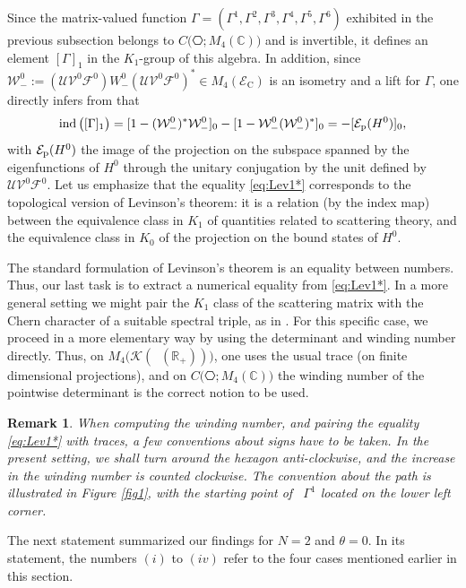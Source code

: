 \documentclass[11pt]{article}
\def\C{\mathbb C}
\def\EEC{\mathscr E_{\mathrm C}}
\def\E{\mathcal  E}
\def\F{\mathscr F}
\def\K{\mathscr K}
\def\R{\mathbb R}
\def\U{\mathcal U}
\def\V{\mathcal V}
\def\W{\mathcal W}
\def\ltwo{\mathop{\mathrm{L}^2}\nolimits}
\def\ind{\mathop{\mathrm{ind}}\nolimits}
\newtheorem{Remark}[Theorem]{Remark}
\begin{document}
Since the matrix-valued function $\Gamma= (\Gamma^1,\Gamma^2,\Gamma^3,\Gamma^4,\Gamma^5,\Gamma^6)$ exhibited in the previous subsection
belongs to $C\big(\hexagon; M_4(\C)\big)$ and is invertible, it defines an element
$[\Gamma]_1$ in the $K_1$-group of this algebra.
In addition, since $\W_-^0:=(\U\V^0\F^0)W_-^0(\U\V^0\F^0)^*\in M_4(\EEC)$ is an isometry and a lift for $\Gamma$, one directly infers from \cite[Prop.~9.2.4.(ii)]{RLL} that
\begin{equation}\label{eq:Lev1*}
\ind\big([\Gamma]_1\big) = [1-(\W^0_-)^*\W_-^0]_0-[1-\W_-^0(\W_-^0)^*]_0 =-[\E_{\rm p}(H^0)]_0,
\end{equation}
with $\E_{\rm p}(H^0)$ the image of the projection on the subspace spanned by the eigenfunctions of $H^0$ through the unitary conjugation by the unit defined by 
$\U\V^0\F^0$.
Let us emphasize that the equality \eqref{eq:Lev1*} corresponds to the topological version of Levinson's theorem: it is a relation (by the index map) between the equivalence class in $K_1$
of quantities related to scattering theory, and the equivalence class in $K_0$ of the projection
on the bound states of $H^0$. 

The standard formulation of Levinson's theorem is an equality between numbers. 
Thus, our last task is to extract a numerical equality from \eqref{eq:Lev1*}. In a more general setting we might pair the $K_1$ class of the scattering matrix with the Chern character of a suitable spectral triple, as in \cite{AR23}. For this specific case, we proceed in a more elementary way by using the determinant and winding number directly.  
Thus, on $M_4\big(\K(\ltwo(\R_+))\big)$, one uses the usual trace (on finite dimensional projections), and on 
$C\big(\hexagon; M_4(\C)\big)$
the winding number of the pointwise determinant is the correct notion to be used.

\begin{Remark}\label{rem:conv}
When computing the winding number, and pairing the equality \eqref{eq:Lev1*}
with traces, a few conventions about signs have to be taken. In the present setting, we shall turn around the hexagon anti-clockwise, 
and the increase in the winding number is counted clockwise.
The convention about the path is illustrated in Figure \ref{fig1}, 
with the starting point of \  $\Gamma^1$ located on the lower left corner.
\end{Remark}

The next statement summarized our findings for $N=2$ and $\theta=0$. In its statement, 
the numbers $(i)$ to $(iv)$ refer to the four cases mentioned earlier in this section.
\end{document}
